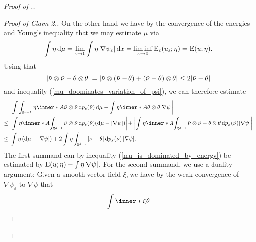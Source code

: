 \begin{proof}[Proof of .]
\begin{proof}[Proof of Claim 2.]
		On the other hand we have by the convergence of the energies and 
		Young's inequality that we 
		may estimate $ \mu $ via 
		\begin{equation}
			\label{mu_is_dominated_by_energy}
			\int
			\eta
			\dd{ \mu }
			=
			\lim_{ \varepsilon \to 0 }
			\int
			\eta
			\abs{ \nabla \psi_{ \varepsilon } }
			\dd{ x }
			=
			\liminf_{ \varepsilon \to 0 }
			\operatorname{E}_{ \varepsilon } ( u_{ \varepsilon } ; \eta )
			=
			\operatorname{E} ( u ; \eta ).
		\end{equation}
		Using that
		\begin{equation*} 
			\abs{ \tilde{ \nu } \otimes \tilde{ \nu } - \theta \otimes \theta } 
			= 
			\abs{ 
				\tilde{ \nu } \otimes ( \tilde{ \nu } - \theta ) 
				+
				( \tilde{ \nu } - \theta ) \otimes \theta
			}
			\leq
			2 \abs{ \tilde{ \nu } - \theta }
		\end{equation*}
		and inequality (\ref{mu_doominates_variation_of_psi}), we can therefore 
		estimate
		\begin{align*}
			&
			\abs{ 
				\int
				\int_{ \mathbb{ S }^{ d - 1 } }
				\eta
				\inner*{ A }{ \tilde{ \nu } \otimes \tilde{ \nu } }
				\dd{ p_{ x } ( \tilde{ \nu } ) }
				\dd{ \mu }
				-
				\int
				\eta
				\inner*{ A }{ \theta \otimes \theta }
				\abs{ \nabla \psi }
			}
			\\
			\leq{} &
			\abs{ 
				\int
				\eta 
				\inner*{ A }
				{ 
					\int_{ \mathbb{ S }^{ d - 1 } }
					\tilde{ \nu } \otimes \tilde{ \nu }
					\dd{ p_{ x } ( \tilde{ \nu } ) }
				}
				( \dd{ \mu } - \abs{ \nabla \psi } )
			}
			+
			\abs{
				\int
				\eta
				\inner*{ A }{
					\int_{ \mathbb{ S }^{ d - 1 } }
					\tilde{ \nu } \otimes \tilde{ \nu }
					-
					\theta \otimes \theta
					\dd{ p_{ x } ( \tilde{ \nu } ) }
				}
				\abs{ \nabla \psi }
			}
			\\
			\leq {} &
			\int
			\eta
			\left( \dd{ \mu } - \abs{ \nabla \psi } \right)
			+
			2
			\int
			\eta
			\int_{ \mathbb{ S }^{ d - 1 } }
			\abs{ \tilde{ \nu } - \theta } 
			\dd{ p_{ x } ( \tilde{ \nu } ) }
			\abs{ \nabla \psi }.
		\end{align*}
		The first summand can by inequality (\ref{mu_is_dominated_by_energy}) 
		be estimated by 
		$ \operatorname{E} ( u ; \eta ) - \int \eta \abs{ \nabla \psi } $.
		For the second summand, we use a duality argument:
		Given a smooth vector field $ \xi $, we have by the weak convergence of 
		$ 
		\nabla \psi_{ \varepsilon } $ to $ \nabla \psi $ that
		\begin{equation*}
			\int
			\inner*{ \xi }{ \theta }

\end{equation*}
\end{proof}
\end{proof}
